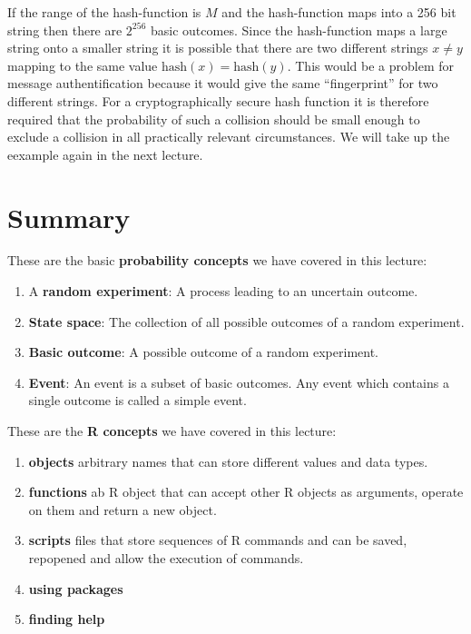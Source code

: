 \documentclass[
]{book}
\providecommand{\tightlist}{%
  \setlength{\itemsep}{0pt}\setlength{\parskip}{0pt}}
\begin{document}
If the range of the hash-function is \(M\) and the hash-function maps into a 256 bit string
then there are \(2^{256}\) basic outcomes. Since the hash-function maps a large string onto
a smaller string it is possible that there are two different strings \(x \neq y\) mapping
to the same value \(\text{hash}(x)=\text{hash}(y)\). This would be a problem for message
authentification because it would give the same ``fingerprint'' for two different strings. For
a cryptographically secure hash function it is therefore required that the probability of
such a collision should be small enough to exclude a collision in all practically
relevant circumstances. We will take up the eexample again in the next lecture.

\hypertarget{summary}{%
\section{Summary}\label{summary}}

These are the basic \textbf{probability concepts} we have covered in this lecture:

\begin{enumerate}
\def\labelenumi{\arabic{enumi}.}
\tightlist
\item
  A \textbf{random experiment}: A process leading to an uncertain outcome.
\item
  \textbf{State space}: The collection of all possible outcomes of a random experiment.
\item
  \textbf{Basic outcome}: A possible outcome of a random experiment.
\item
  \textbf{Event}: An event is a subset of basic outcomes. Any event which contains a single outcome is called a simple event.
\end{enumerate}

These are the \textbf{R concepts} we have covered in this lecture:

\begin{enumerate}
\def\labelenumi{\arabic{enumi}.}
\tightlist
\item
  \textbf{objects} arbitrary names that can store different values and data types.
\item
  \textbf{functions} ab R object that can accept other R objects as arguments, operate on them and return a new object.
\item
  \textbf{scripts} files that store sequences of R commands and can be saved, repopened and allow the
  execution of commands.
\item
  \textbf{using packages}
\item
  \textbf{finding help}
\end{enumerate}
\end{document}
